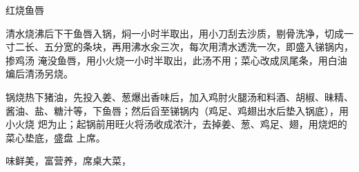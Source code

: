 \begin{recipe}{红烧鱼唇}

\ingredients


\preparation

\step 清水烧沸后下干鱼唇入锅，焖一小时半取出，用小刀刮去沙质，剔骨洗净，切成一
寸二长、五分宽的条块，再用沸水汆三次，每次用清水透洗一次，即盛入锑锅内，掺鸡汤
淹没鱼唇，用小火烧一小时半取出，此汤不用；菜心改成凤尾条，用白油煸后清汤另烧。

\step 锅烧热下猪油，先投入姜、葱爆出香味后，加入鸡肘火腿汤和料酒、胡椒、昧精、
酱油、盐、糖汁等，下鱼唇；然后舀至锑锅内（鸡足、鸡翅出水后垫入锅底），用小火烧
𤆵为止；起锅前用旺火将汤收成浓汁，去掉姜、葱、鸡足、翅，用烧𤆵的菜心垫底，盛盘
上席。

\features

味鲜美，富营养，席桌大菜，

\end{recipe}

